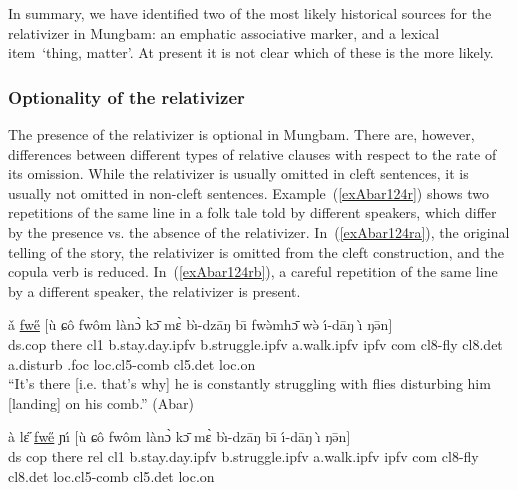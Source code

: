 \documentclass[10pt,twoside]{article}
\makeatletter
\newcommand{\gl}[1]{`#1'}
\newcommand{\cl}[1]{{\sc cl#1}}
\newcommand{\pref}[1]{(\ref{#1})}
\newcommand{\sref}[1]{Section \ref{#1}}
\renewcommand{\i}{ı}
\def\@{ə}
\def\eh{ɛ}
\def\aw{ɔ}
\def\ng{ŋ}
\def\ny{ɲ}
\def\sh{ɕ}
\newcommand{\comment}[1]{\textcolor{blue}{\emph{#1}}}
\makeatother
\begin{document}
In summary, we have identified two of the most likely historical sources
for the relativizer in Mungbam: an emphatic associative marker, and a lexical
item~\gl{thing, matter}. At present it is not clear which of these
is the more likely.
%
%

\subsubsection{Optionality of the relativizer}
%

The presence of the relativizer is optional in Mungbam. There are,
however, differences between different types of relative clauses with
respect to the rate of its omission. While the relativizer is usually
omitted in cleft sentences, it is usually not omitted in non-cleft sentences.
Example~\pref{exAbar124r} shows two repetitions of the same line
in a folk tale told by different speakers, which differ by
the presence vs. the absence of the relativizer. In~\pref{exAbar124ra},
the original telling of the story, the relativizer is omitted
from the cleft construction, and the copula verb is reduced.
In~\pref{exAbar124rb}, a careful repetition of the same line by
a different speaker, the relativizer is present.
%
\begin{exe}
\ex	\label{exAbar124r}
\begin{xlist}
\ex	\label{exAbar124ra}
\gll \v{a} \uline{fw\H{e}} $[$\`u \sh\^o fw\^om l\`an{\`\aw} k\={\aw} m\`{\eh} b\`\i-dz\={a}{\ng} b\={\i} fw\`{\@}mh\={\aw} w\`{\@} \'\i-d\=a{\ng} \`{\i} \ng\={\@}n$]$	\\
{\sc ds.cop} there \cl1 b.stay.day.{\sc ipfv} b.struggle.{\sc ipfv} a.walk.{\sc ipfv} {\sc ipfv}
{\sc com} \cl8-fly \cl8.{\sc det} a.disturb {\sc \cl1.foc} {\sc loc.\cl5-}comb \cl5.{\sc det} {\sc loc.}on	\\
\glt ``It's there [i.e. that's why] he is constantly struggling with flies disturbing
him [landing] on his comb.'' (Abar) %

\ex	\label{exAbar124rb}
\gll \`a l\H{\eh} \uline{fw\H{e}} \ny\'{\i} $[$\`u \sh\^o fw\^om l\`an{\`\aw} k\={\aw} m\`{\eh} b\`\i-dz\={a}{\ng} b\={\i} \'\i-d\=a{\ng} \`{\i} \ng\={\@}n$]$	\\
{\sc ds} {\sc cop} there {\sc rel} \cl1 b.stay.day.{\sc ipfv} b.struggle.{\sc ipfv} a.walk.{\sc ipfv} {\sc ipfv}
{\sc com} \cl8-fly \cl8.{\sc det} {\sc loc.\cl5-}comb \cl5.{\sc det} {\sc loc.}on	\\
\end{xlist}
\end{exe}
%
%
\end{document}
